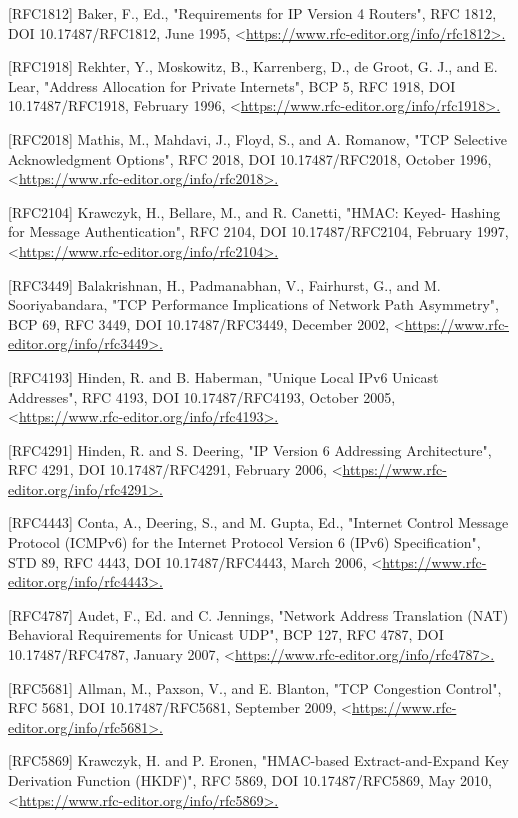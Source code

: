 \documentclass{article}
\begin{document}
[RFC1812]  Baker, F., Ed., "Requirements for IP Version 4 Routers", RFC 1812, DOI 10.17487/RFC1812, June 1995, <\url{https://www.rfc-editor.org/info/rfc1812>.}

[RFC1918]  Rekhter, Y., Moskowitz, B., Karrenberg, D., de Groot, G. J., and E. Lear, "Address Allocation for Private Internets", BCP 5, RFC 1918, DOI 10.17487/RFC1918, February 1996, <\url{https://www.rfc-editor.org/info/rfc1918>.}

[RFC2018]  Mathis, M., Mahdavi, J., Floyd, S., and A. Romanow, "TCP Selective Acknowledgment Options", RFC 2018, DOI 10.17487/RFC2018, October 1996, <\url{https://www.rfc-editor.org/info/rfc2018>.}

[RFC2104]  Krawczyk, H., Bellare, M., and R. Canetti, "HMAC: Keyed- Hashing for Message Authentication", RFC 2104, DOI 10.17487/RFC2104, February 1997, <\url{https://www.rfc-editor.org/info/rfc2104>.}

[RFC3449]  Balakrishnan, H., Padmanabhan, V., Fairhurst, G., and M. Sooriyabandara, "TCP Performance Implications of Network Path Asymmetry", BCP 69, RFC 3449, DOI 10.17487/RFC3449, December 2002, <\url{https://www.rfc-editor.org/info/rfc3449>.}

[RFC4193]  Hinden, R. and B. Haberman, "Unique Local IPv6 Unicast Addresses", RFC 4193, DOI 10.17487/RFC4193, October 2005, <\url{https://www.rfc-editor.org/info/rfc4193>.}

[RFC4291]  Hinden, R. and S. Deering, "IP Version 6 Addressing Architecture", RFC 4291, DOI 10.17487/RFC4291, February 2006, <\url{https://www.rfc-editor.org/info/rfc4291>.}

[RFC4443]  Conta, A., Deering, S., and M. Gupta, Ed., "Internet Control Message Protocol (ICMPv6) for the Internet Protocol Version 6 (IPv6) Specification", STD 89, RFC 4443, DOI 10.17487/RFC4443, March 2006, <\url{https://www.rfc-editor.org/info/rfc4443>.}

[RFC4787]  Audet, F., Ed. and C. Jennings, "Network Address Translation (NAT) Behavioral Requirements for Unicast UDP", BCP 127, RFC 4787, DOI 10.17487/RFC4787, January 2007, <\url{https://www.rfc-editor.org/info/rfc4787>.}

[RFC5681]  Allman, M., Paxson, V., and E. Blanton, "TCP Congestion Control", RFC 5681, DOI 10.17487/RFC5681, September 2009, <\url{https://www.rfc-editor.org/info/rfc5681>.}

[RFC5869]  Krawczyk, H. and P. Eronen, "HMAC-based Extract-and-Expand Key Derivation Function (HKDF)", RFC 5869, DOI 10.17487/RFC5869, May 2010, <\url{https://www.rfc-editor.org/info/rfc5869>.}
\end{document}
